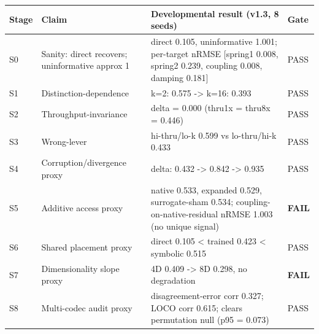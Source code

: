 \documentclass[
  11pt,
]{article}
\newcounter{none} %
\begin{document}
{\def\LTcaptype{none} %
\begin{longtable}[]{@{}
  >{\raggedright\arraybackslash}p{}
  >{\raggedright\arraybackslash}p{}
  >{\raggedright\arraybackslash}p{}
  >{\raggedright\arraybackslash}p{}@{}}
\toprule\noalign{}
\begin{minipage}[b]{\linewidth}\raggedright
Stage
\end{minipage} &
\begin{minipage}[b]{\linewidth}\raggedright
Claim
\end{minipage} &
\begin{minipage}[b]{\linewidth}\raggedright
Developmental result (v1.3, 8 seeds)
\end{minipage} &
\begin{minipage}[b]{\linewidth}\raggedright
Gate
\end{minipage} \\
\midrule\noalign{}
\endhead
\bottomrule\noalign{}
\endlastfoot
S0 & Sanity: direct recovers; uninformative
approx 1 & direct 0.105, uninformative 1.001;
per-target nRMSE {[}spring1 0.008, spring2
0.239, coupling 0.008, damping 0.181{]} &
PASS \\
S1 & Distinction-dependence & k=2: 0.575
-\textgreater{} k=16: 0.393 & PASS \\
S2 & Throughput-invariance & delta = 0.000
(thru1x = thru8x = 0.446) & PASS \\
S3 & Wrong-lever & hi-thru/lo-k 0.599 vs
lo-thru/hi-k 0.433 & PASS \\
S4 & Corruption/divergence proxy & delta: 0.432
-\textgreater{} 0.842 -\textgreater{} 0.935 &
PASS \\
S5 & Additive access proxy & native 0.533,
expanded 0.529, surrogate-sham 0.534;
coupling-on-native-residual nRMSE 1.003 (no
unique signal) & \textbf{FAIL} \\
S6 & Shared placement proxy & direct 0.105
\textless{} trained 0.423 \textless{} symbolic
0.515 & PASS \\
S7 & Dimensionality slope proxy & 4D 0.409
-\textgreater{} 8D 0.298, no degradation &
\textbf{FAIL} \\
S8 & Multi-codec audit proxy &
disagreement-error corr 0.327; LOCO corr 0.615;
clears permutation null (p95 = 0.073) & PASS \\
\end{longtable}
}
\end{document}
